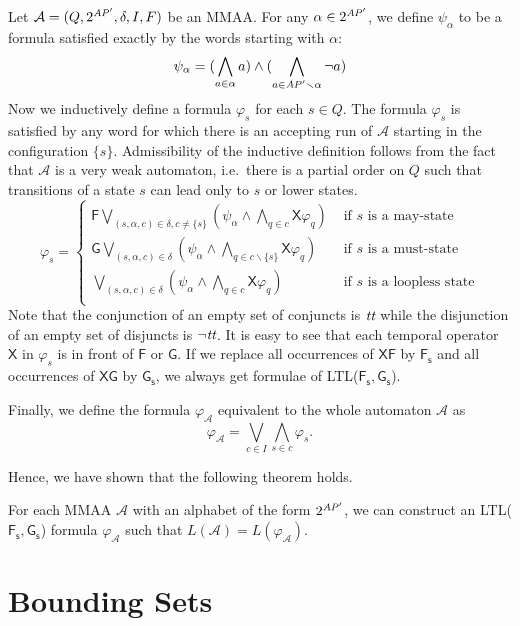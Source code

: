 \documentclass{llncs}
\newcommand{\X}{\mathsf{X}}     \newcommand{\U}{{\,\uU\,}}      \newcommand{\uU}{\mathsf{U}}    \newcommand{\rR}{\mathsf{R}}    \newcommand{\R}{{\,\rR\,}}      \newcommand{\F}{\mathsf{F}}     \newcommand{\G}{\mathsf{G}}     \newcommand{\Fs}{{\F\!\s}}      \newcommand{\Gs}{{\G\s}}        \newcommand{\s}{_\mathsf{s}}
\newcommand{\true}{\textrm{{\it tt}}}
\newcommand{\AP}{\mathit{A\hskip-0.1ex P}}
\newcommand{\mA}{\mathcal{A}}
\begin{document}
Let $\mA=(Q,2^{\AP'},\delta,I,F)$ be an MMAA. For any $\alpha\in 2^{\AP'}$, we 
define $\psi_\alpha$ to be a formula satisfied exactly by the words starting 
with $\alpha$:
$$\psi_\alpha=
(\bigwedge_{a\in\alpha}a)\wedge(\bigwedge_{a\in\AP'\smallsetminus\alpha}\neg
a)$$ 
Now we inductively define a formula $\varphi_s$ for each $s\in Q$.  The
formula $\varphi_s$ is satisfied by any word for which there is an
accepting run of $\mA$ starting in the configuration $\{s\}$.  Admissibility of
the inductive definition follows from the fact that $\mA$ is a very weak
automaton, i.e.~there is a partial order on $Q$ such that transitions of a
state $s$ can lead only to $s$ or lower states.
\[
\varphi_s=\left\{
  \begin{array}{ll}\F\bigvee_{(s,\alpha,c)\in\delta,
      c\neq\{s\}}(\psi_\alpha\wedge\bigwedge_{q\in c}\X\varphi_q) & 
    \textrm{ if $s$ is a may-state}\\
    \G\bigvee_{(s,\alpha,c)\in\delta}(\psi_\alpha\wedge\bigwedge_{q\in
      c\smallsetminus\{s\}}\X\varphi_q) &
    \textrm{ if $s$ is a must-state}\\      
    \bigvee_{(s,\alpha,c)\in\delta}(\psi_\alpha\wedge\bigwedge_{q\in
      c}\X\varphi_q) &
    \textrm{ if $s$ is a loopless state}\\      
  \end{array}
  \right.
\]
Note that the conjunction of an empty set of conjuncts is $\true$ while
the disjunction of an empty set of disjuncts is $\neg\true$. It is easy to see
that each temporal operator $\X$ in $\varphi_s$ is in front of $\F$ or $\G$.
If we replace all occurrences of $\X\F$ by $\Fs$ and all occurrences of
$\X\G$ by $\Gs$,
we always get formulae of LTL($\Fs,\Gs$).

Finally, we define the formula $\varphi_\mA$ equivalent to the whole
automaton $\mA$ as
$$\varphi_\mA=\bigvee_{c\in I}\bigwedge_{s\in c}\varphi_s.$$

Hence, we have shown that the following theorem holds.
\begin{theorem}
  For each MMAA $\mA$ with an alphabet of the form $2^{\AP'}$, we can
  construct an LTL($\Fs,\Gs$) formula $\varphi_\mA$ such that
  $L(\mA)=L(\varphi_\mA)$.
\end{theorem}



\section{Bounding Sets}\label{app:Zset}
\end{document}
